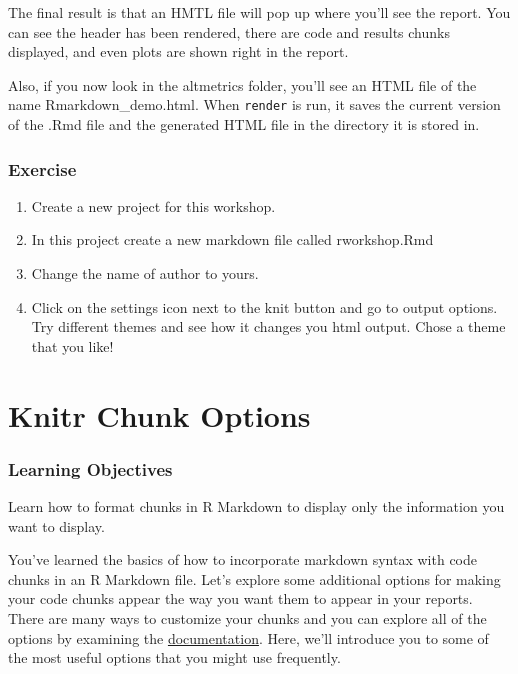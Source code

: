 \documentclass[
]{book}
\providecommand{\tightlist}{%
  \setlength{\itemsep}{0pt}\setlength{\parskip}{0pt}}
\begin{document}
The final result is that an HMTL file will pop up where you'll see the report. You can see the header has been rendered, there are code and results chunks displayed, and even plots are shown right in the report.

Also, if you now look in the altmetrics folder, you'll see an HTML file of the name Rmarkdown\_demo.html. When \texttt{render} is run, it saves the current version of the .Rmd file and the generated HTML file in the directory it is stored in.

\hypertarget{exercise}{%
\subsubsection{Exercise}\label{exercise}}

\begin{enumerate}
\def\labelenumi{\arabic{enumi}.}
\tightlist
\item
  Create a new project for this workshop.
\item
  In this project create a new markdown file called rworkshop.Rmd
\item
  Change the name of author to yours.
\item
  Click on the settings icon next to the knit button and go to output options. Try different themes and see how it changes you html output. Chose a theme that you like!
\end{enumerate}

\hypertarget{knitr-chunk-options}{%
\section{Knitr Chunk Options}\label{knitr-chunk-options}}

\hypertarget{learning-objectives-1}{%
\subsubsection*{Learning Objectives}\label{learning-objectives-1}}

Learn how to format chunks in R Markdown to display only the information you want to display.

You've learned the basics of how to incorporate markdown syntax with code chunks in an R Markdown file. Let's explore some additional options for making your code chunks appear the way you want them to appear in your reports. There are many ways to customize your chunks and you can explore all of the options by examining the \href{http://yihui.name/knitr/options/\#chunk_options}{documentation}. Here, we'll introduce you to some of the most useful options that you might use frequently.
\end{document}
